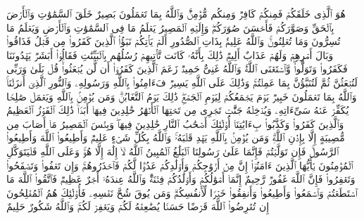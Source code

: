 \startbuffer[\q:64:2]
هُوَ ٱلَّذِی خَلَقَكُمۡ فَمِنكُمۡ كَافِرࣱ وَمِنكُم مُّؤۡمِنࣱۚ وَٱللَّهُ بِمَا تَعۡمَلُونَ بَصِیرٌ%
\stopbuffer%
\startbuffer[\q:64:3]
خَلَقَ ٱلسَّمَٰوَٰتِ وَٱلۡأَرۡضَ بِٱلۡحَقِّ وَصَوَّرَكُمۡ فَأَحۡسَنَ صُوَرَكُمۡۖ وَإِلَیۡهِ ٱلۡمَصِیرُ%
\stopbuffer%
\startbuffer[\q:64:4]
یَعۡلَمُ مَا فِی ٱلسَّمَٰوَٰتِ وَٱلۡأَرۡضِ وَیَعۡلَمُ مَا تُسِرُّونَ وَمَا تُعۡلِنُونَۚ وَٱللَّهُ عَلِیمُۢ بِذَاتِ ٱلصُّدُورِ%
\stopbuffer%
\startbuffer[\q:64:5]
أَلَمۡ یَأۡتِكُمۡ نَبَؤُا۟ ٱلَّذِینَ كَفَرُوا۟ مِن قَبۡلُ فَذَاقُوا۟ وَبَالَ أَمۡرِهِمۡ وَلَهُمۡ عَذَابٌ أَلِیمࣱ%
\stopbuffer%
\startbuffer[\q:64:6]
ذَٰلِكَ بِأَنَّهُۥ كَانَت تَّأۡتِیهِمۡ رُسُلُهُم بِٱلۡبَیِّنَٰتِ فَقَالُوۤا۟ أَبَشَرࣱ یَهۡدُونَنَا فَكَفَرُوا۟ وَتَوَلَّوا۟ۖ وَّٱسۡتَغۡنَى ٱللَّهُۚ وَٱللَّهُ غَنِیٌّ حَمِیدࣱ%
\stopbuffer%
\startbuffer[\q:64:7]
زَعَمَ ٱلَّذِینَ كَفَرُوۤا۟ أَن لَّن یُبۡعَثُوا۟ۚ قُلۡ بَلَىٰ وَرَبِّی لَتُبۡعَثُنَّ ثُمَّ لَتُنَبَّؤُنَّ بِمَا عَمِلۡتُمۡۚ وَذَٰلِكَ عَلَى ٱللَّهِ یَسِیرࣱ%
\stopbuffer%
\startbuffer[\q:64:8]
فَءَامِنُوا۟ بِٱللَّهِ وَرَسُولِهِۦ وَٱلنُّورِ ٱلَّذِیۤ أَنزَلۡنَاۚ وَٱللَّهُ بِمَا تَعۡمَلُونَ خَبِیرࣱ%
\stopbuffer%
\startbuffer[\q:64:9]
یَوۡمَ یَجۡمَعُكُمۡ لِیَوۡمِ ٱلۡجَمۡعِۖ ذَٰلِكَ یَوۡمُ ٱلتَّغَابُنِۗ وَمَن یُؤۡمِنۢ بِٱللَّهِ وَیَعۡمَلۡ صَٰلِحࣰا یُكَفِّرۡ عَنۡهُ سَیِّءَاتِهِۦ وَیُدۡخِلۡهُ جَنَّٰتࣲ تَجۡرِی مِن تَحۡتِهَا ٱلۡأَنۡهَٰرُ خَٰلِدِینَ فِیهَاۤ أَبَدࣰاۚ ذَٰلِكَ ٱلۡفَوۡزُ ٱلۡعَظِیمُ%
\stopbuffer%
\startbuffer[\q:64:10]
وَٱلَّذِینَ كَفَرُوا۟ وَكَذَّبُوا۟ بِءَایَٰتِنَاۤ أُو۟لَٰۤئِكَ أَصۡحَٰبُ ٱلنَّارِ خَٰلِدِینَ فِیهَاۖ وَبِئۡسَ ٱلۡمَصِیرُ%
\stopbuffer%
\startbuffer[\q:64:11]
مَاۤ أَصَابَ مِن مُّصِیبَةٍ إِلَّا بِإِذۡنِ ٱللَّهِۗ وَمَن یُؤۡمِنۢ بِٱللَّهِ یَهۡدِ قَلۡبَهُۥۚ وَٱللَّهُ بِكُلِّ شَیۡءٍ عَلِیمࣱ%
\stopbuffer%
\startbuffer[\q:64:12]
وَأَطِیعُوا۟ ٱللَّهَ وَأَطِیعُوا۟ ٱلرَّسُولَۚ فَإِن تَوَلَّیۡتُمۡ فَإِنَّمَا عَلَىٰ رَسُولِنَا ٱلۡبَلَٰغُ ٱلۡمُبِینُ%
\stopbuffer%
\startbuffer[\q:64:13]
ٱللَّهُ لَاۤ إِلَٰهَ إِلَّا هُوَۚ وَعَلَى ٱللَّهِ فَلۡیَتَوَكَّلِ ٱلۡمُؤۡمِنُونَ%
\stopbuffer%
\startbuffer[\q:64:14]
یَٰۤأَیُّهَا ٱلَّذِینَ ءَامَنُوۤا۟ إِنَّ مِنۡ أَزۡوَٰجِكُمۡ وَأَوۡلَٰدِكُمۡ عَدُوࣰّا لَّكُمۡ فَٱحۡذَرُوهُمۡۚ وَإِن تَعۡفُوا۟ وَتَصۡفَحُوا۟ وَتَغۡفِرُوا۟ فَإِنَّ ٱللَّهَ غَفُورࣱ رَّحِیمٌ%
\stopbuffer%
\startbuffer[\q:64:15]
إِنَّمَاۤ أَمۡوَٰلُكُمۡ وَأَوۡلَٰدُكُمۡ فِتۡنَةࣱۚ وَٱللَّهُ عِندَهُۥۤ أَجۡرٌ عَظِیمࣱ%
\stopbuffer%
\startbuffer[\q:64:16]
فَٱتَّقُوا۟ ٱللَّهَ مَا ٱسۡتَطَعۡتُمۡ وَٱسۡمَعُوا۟ وَأَطِیعُوا۟ وَأَنفِقُوا۟ خَیۡرࣰا لِّأَنفُسِكُمۡۗ وَمَن یُوقَ شُحَّ نَفۡسِهِۦ فَأُو۟لَٰۤئِكَ هُمُ ٱلۡمُفۡلِحُونَ%
\stopbuffer%
\startbuffer[\q:64:17]
إِن تُقۡرِضُوا۟ ٱللَّهَ قَرۡضًا حَسَنࣰا یُضَٰعِفۡهُ لَكُمۡ وَیَغۡفِرۡ لَكُمۡۚ وَٱللَّهُ شَكُورٌ حَلِیمٌ%
